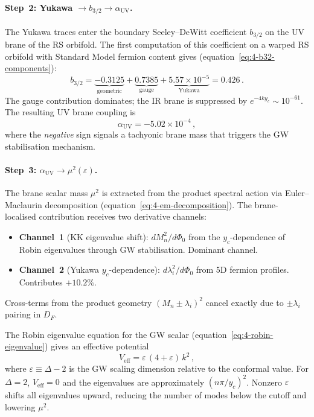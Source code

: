\paragraph{Step~2: Yukawa $\to b_{3/2} \to \alpha_\mathrm{UV}$.}
The Yukawa traces enter the boundary Seeley--DeWitt coefficient $b_{3/2}$ on the UV brane of the RS orbifold.  The first computation of this coefficient on a warped RS orbifold with Standard Model fermion content gives (equation~\eqref{eq:4-b32-components}):
\begin{equation}
  b_{3/2} = \underbrace{-0.3125}_{\text{geometric}} + \underbrace{0.7385}_{\text{gauge}} + \underbrace{5.57 \times 10^{-5}}_{\text{Yukawa}} = 0.426\,.
\end{equation}
The gauge contribution dominates; the IR brane is suppressed by $e^{-4ky_c} \sim 10^{-61}$.  The resulting UV brane coupling is
\begin{equation}
  \alpha_\mathrm{UV} = -5.02 \times 10^{-4}\,,
  \label{eq:E-alpha-uv}
\end{equation}
where the \emph{negative} sign signals a tachyonic brane mass that triggers the GW stabilisation mechanism.

\paragraph{Step~3: $\alpha_\mathrm{UV} \to \mu^2(\varepsilon)$.}
The brane scalar mass $\mu^2$ is extracted from the product spectral action via Euler--Maclaurin decomposition (equation~\eqref{eq:4-em-decomposition}).  The brane-localised contribution receives two derivative channels:
\begin{itemize}
  \item \textbf{Channel~1} (KK eigenvalue shift): $dM_n^2/d\Phi_0$ from the $y_c$-dependence of Robin eigenvalues through GW stabilisation.  Dominant channel.
  \item \textbf{Channel~2} (Yukawa $y_c$-dependence): $d\lambda_i^2/d\Phi_0$ from 5D fermion profiles.  Contributes $+10.2\%$.
\end{itemize}
Cross-terms from the product geometry $(M_n \pm \lambda_i)^2$ cancel exactly due to $\pm\lambda_i$ pairing in $D_F$.

The Robin eigenvalue equation for the GW scalar (equation~\eqref{eq:4-robin-eigenvalue}) gives an effective potential
\begin{equation}
  V_\mathrm{eff} = \varepsilon\,(4 + \varepsilon)\, k^2\,,
  \label{eq:E-veff}
\end{equation}
where $\varepsilon \equiv \Delta - 2$ is the GW scaling dimension relative to the conformal value.  For $\Delta = 2$, $V_\mathrm{eff} = 0$ and the eigenvalues are approximately $(n\pi/y_c)^2$.  Nonzero $\varepsilon$ shifts all eigenvalues upward, reducing the number of modes below the cutoff and lowering $\mu^2$.

